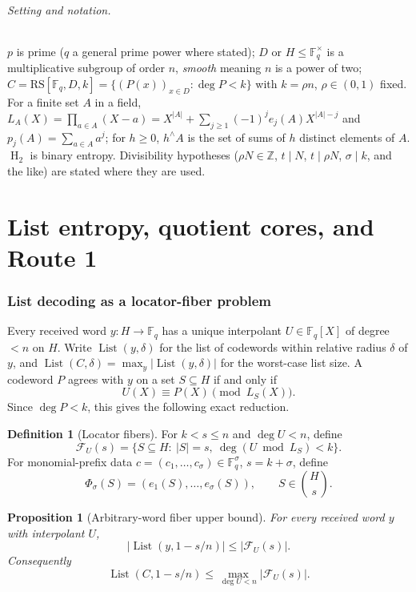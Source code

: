 \documentclass[11pt]{article}
\newtheorem{proposition}[proposition]{Proposition}
\theoremstyle{definition}
\newtheorem{definition}[definition]{Definition}
\newcommand{\F}{\mathbb F}
\newcommand{\Z}{\mathbb Z}
\newcommand{\HH}{\operatorname{H}_2}
\newcommand{\RS}{\mathrm{RS}}
\newcommand{\Lst}{\operatorname{List}}
\newcommand{\Fib}{\mathcal F}
\newcommand{\List}{\operatorname{List}}
\begin{document}
\paragraph{Setting and notation.}
$p$ is prime ($q$ a general prime power where stated); $D$ or $H\le\F_q^\times$ is a multiplicative subgroup of order $n$, \emph{smooth} meaning $n$ is a power of two; $C=\RS[\F_q,D,k]=\{(P(x))_{x\in D}:\deg P<k\}$ with $k=\rho n$, $\rho\in(0,1)$ fixed.  For a finite set $A$ in a field, $L_A(X)=\prod_{a\in A}(X-a)=X^{|A|}+\sum_{j\ge1}(-1)^je_j(A)X^{|A|-j}$ and $p_j(A)=\sum_{a\in A}a^j$; for $h\ge0$, $h^{\wedge}A$ is the set of sums of $h$ distinct elements of $A$.  $\HH$ is binary entropy.  Divisibility hypotheses ($\rho N\in\Z$, $t\mid N$, $t\mid\rho N$, $\sigma\mid k$, and the like) are stated where they are used.

\part{List entropy, quotient cores, and Route 1}

\section{List decoding as a locator-fiber problem}\label{sec:fiber}

Every received word $y:H\to\F_q$ has a unique interpolant $U\in\F_q[X]$ of degree $<n$ on $H$.  Write $\List(y,\delta)$ for the list of codewords within relative radius $\delta$ of $y$, and $\Lst(C,\delta)=\max_y|\List(y,\delta)|$ for the worst-case list size.  A codeword $P$ agrees with $y$ on a set $S\subseteq H$ if and only if
\[
        U(X)\equiv P(X)\pmod{L_S(X)}.
\]
Since $\deg P<k$, this gives the following exact reduction.

\begin{definition}[Locator fibers]\label{def:locator-fiber}
For $k<s\le n$ and $\deg U<n$, define
\[
        \Fib_U(s)=\{S\subseteq H:\ |S|=s,\ \deg(U\bmod L_S)<k\}.
\]
For monomial-prefix data $c=(c_1,\ldots,c_\sigma)\in\F_q^\sigma$, $s=k+\sigma$, define
\[
        \Phi_\sigma(S)=(e_1(S),\ldots,e_\sigma(S)),
        \qquad S\in\binom Hs .
\]
\end{definition}

\begin{proposition}[Arbitrary-word fiber upper bound]\label{prop:arb-fiber}
For every received word $y$ with interpolant $U$,
\[
        |\List(y,1-s/n)|\le |\Fib_U(s)|.
\]
Consequently
\[
        \Lst(C,1-s/n)\le \max_{\deg U<n}|\Fib_U(s)|.
\]
\end{proposition}
\end{document}
